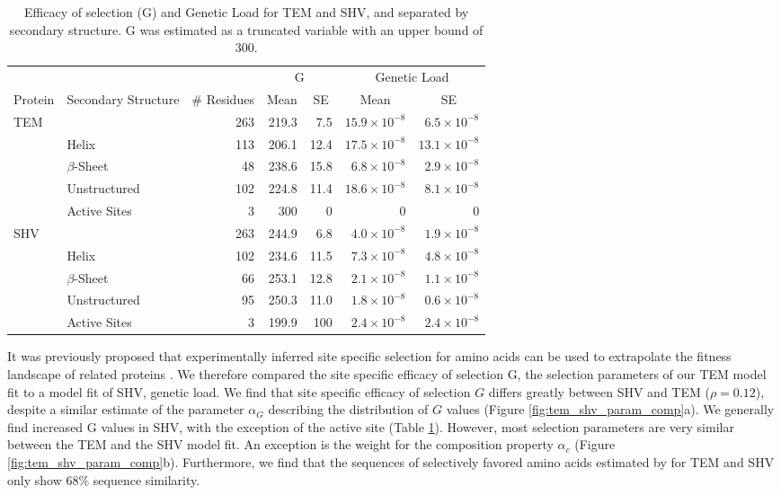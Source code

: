 \begin{table}
  \centering
  \begin{tabular}{llrrrrr}
    & & & \multicolumn{2}{c}{G} & \multicolumn{2}{c}{Genetic Load} \\ 
    Protein & Secondary Structure & \# Residues	& \multicolumn{1}{c}{Mean} & \multicolumn{1}{c}{SE} & \multicolumn{1}{c}{Mean} & \multicolumn{1}{c}{SE} \\ \hline 
    TEM	&		& 263 & 219.3 & 7.5  & $15.9\times10^{-8}$ & $6.5\times10^{-8}$ \\
    &Helix 		& 113 & 206.1 & 12.4 & $17.5\times10^{-8}$ & $13.1\times10^{-8}$ \\
    &$\beta$-Sheet 	&  48 & 238.6 & 15.8 & $ 6.8\times10^{-8}$ & $2.9\times10^{-8}$ \\
    &Unstructured 	& 102 & 224.8 & 11.4 & $18.6\times10^{-8}$ & $8.1\times10^{-8}$ \\
    &Active Sites 	&   3 & 300   & 0    & 0      & 0      \\ \hline
    
    SHV&		& 263 & 244.9 & 6.8  & $4.0\times10^{-8}$ & $1.9\times10^{-8}$ \\
    &Helix		& 102 & 234.6 & 11.5 & $7.3\times10^{-8}$ & $4.8\times10^{-8}$ \\
    &$\beta$-Sheet 	&  66 & 253.1 & 12.8 & $2.1\times10^{-8}$ & $1.1\times10^{-8}$ \\
    &Unstructured	&  95 & 250.3 & 11.0 & $1.8\times10^{-8}$ & $0.6\times10^{-8}$  \\
    &Active Sites	&   3 & 199.9 & 100  & $2.4\times10^{-8}$ & $2.4\times10^{-8}$ \\

  \end{tabular}
  \caption{Efficacy of selection (G) and Genetic Load for TEM and SHV, and separated by secondary structure. G was estimated as a truncated variable with an upper bound of 300.}
  \label{tab:selection}
\end{table}

It was previously proposed that experimentally inferred site specific selection for amino acids can be used to extrapolate the fitness landscape of related proteins \citep{bloom2014, bloom2017}.
We therefore compared the site specific efficacy of selection G, the \selac selection parameters of our \selac TEM model fit to a \selac model fit of SHV, genetic load.
We find that site specific efficacy of selection $G$ differs greatly between SHV and TEM ($\rho = 0.12$), despite a similar estimate of the parameter $\alpha_G$ describing the distribution of $G$ values (Figure \ref{fig:tem_shv_param_comp}a).
We generally find increased G values in SHV, with the exception of the active site (Table \ref{tab:selection}).
However, most \selac selection parameters are very similar between the TEM and the SHV model fit. 
An exception is the weight for the \PC composition property $\alpha_c$ (Figure \ref{fig:tem_shv_param_comp}b).
Furthermore, we find that the sequences of selectively favored amino acids estimated by \selac for TEM and SHV only show $68 \%$ sequence similarity.

